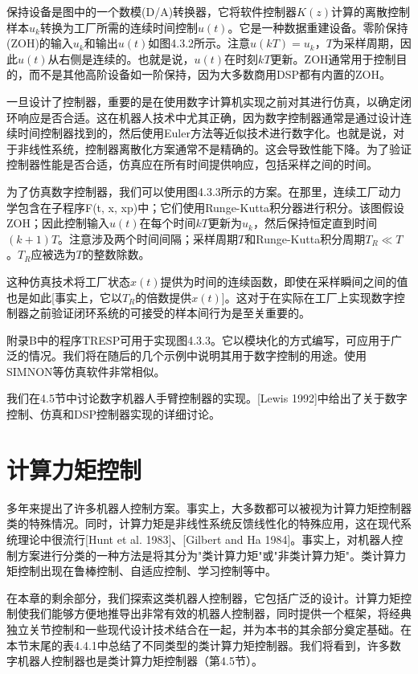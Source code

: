 \documentclass[UTF8]{ctexart}
\theoremstyle{definition}
\begin{document}
保持设备是图中的一个数模(D/A)转换器，它将软件控制器$K(z)$计算的离散控制样本$u_k$转换为工厂所需的连续时间控制$u(t)$。它是一种数据重建设备。零阶保持(ZOH)的输入$u_k$和输出$u(t)$如图4.3.2所示。注意$u(kT) = u_k$，$T$为采样周期，因此$u(t)$从右侧是连续的。也就是说，$u(t)$在时刻$kT$更新。ZOH通常用于控制目的，而不是其他高阶设备如一阶保持，因为大多数商用DSP都有内置的ZOH。

一旦设计了控制器，重要的是在使用数字计算机实现之前对其进行仿真，以确定闭环响应是否合适。这在机器人技术中尤其正确，因为数字控制器通常是通过设计连续时间控制器找到的，然后使用Euler方法等近似技术进行数字化。也就是说，对于非线性系统，控制器离散化方案通常不是精确的。这会导致性能下降。为了验证控制器性能是否合适，仿真应在所有时间提供响应，包括采样之间的时间。

为了仿真数字控制器，我们可以使用图4.3.3所示的方案。在那里，连续工厂动力学包含在子程序F(t, x, xp)中；它们使用Runge-Kutta积分器进行积分。该图假设ZOH；因此控制输入$u(t)$在每个时间$kT$更新为$u_k$，然后保持恒定直到时间$(k+1)T$。注意涉及两个时间间隔；采样周期$T$和Runge-Kutta积分周期$T_R \ll T$。$T_R$应被选为$T$的整数除数。

这种仿真技术将工厂状态$x(t)$提供为时间的连续函数，即使在采样瞬间之间的值也是如此[事实上，它以$T_R$的倍数提供$x(t)$]。这对于在实际在工厂上实现数字控制器之前验证闭环系统的可接受的样本间行为是至关重要的。

附录B中的程序TRESP可用于实现图4.3.3。它以模块化的方式编写，可应用于广泛的情况。我们将在随后的几个示例中说明其用于数字控制的用途。使用SIMNON等仿真软件非常相似。

我们在4.5节中讨论数字机器人手臂控制器的实现。[Lewis 1992]中给出了关于数字控制、仿真和DSP控制器实现的详细讨论。

\section{计算力矩控制}

多年来提出了许多机器人控制方案。事实上，大多数都可以被视为计算力矩控制器类的特殊情况。同时，计算力矩是非线性系统反馈线性化的特殊应用，这在现代系统理论中很流行[Hunt et al. 1983]、[Gilbert and Ha 1984]。事实上，对机器人控制方案进行分类的一种方法是将其分为"类计算力矩"或"非类计算力矩"。类计算力矩控制出现在鲁棒控制、自适应控制、学习控制等中。

在本章的剩余部分，我们探索这类机器人控制器，它包括广泛的设计。计算力矩控制使我们能够方便地推导出非常有效的机器人控制器，同时提供一个框架，将经典独立关节控制和一些现代设计技术结合在一起，并为本书的其余部分奠定基础。在本节末尾的表4.4.1中总结了不同类型的类计算力矩控制器。我们将看到，许多数字机器人控制器也是类计算力矩控制器（第4.5节）。
\end{document}
